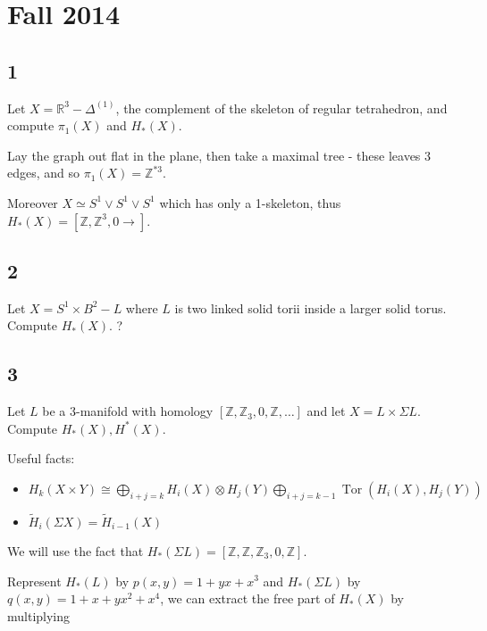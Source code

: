 \hypertarget{fall-2014}{%
\section{Fall 2014}\label{fall-2014}}

\hypertarget{section}{%
\subsection{1}\label{section}}

Let \(X = {\mathbb{R}}^3 - \Delta^{(1)}\), the complement of the
skeleton of regular tetrahedron, and compute \(\pi_1(X)\) and
\(H_*(X)\).

Lay the graph out flat in the plane, then take a maximal tree - these
leaves 3 edges, and so \(\pi_1(X) = {\mathbb{Z}}^{\ast 3}\).

Moreover \(X \simeq S^1\vee S^1 \vee S^1\) which has only a 1-skeleton,
thus \(H_*(X) = [{\mathbb{Z}}, {\mathbb{Z}}^3, 0\rightarrow]\).

\hypertarget{section-1}{%
\subsection{2}\label{section-1}}

Let \(X = S^1 \times B^2 - L\) where \(L\) is two linked solid torii
inside a larger solid torus. Compute \(H_*(X)\). ?

\hypertarget{section-2}{%
\subsection{3}\label{section-2}}

Let \(L\) be a 3-manifold with homology
\([{\mathbb{Z}}, {\mathbb{Z}}_3, 0, {\mathbb{Z}}, \ldots]\) and let
\(X = L \times\Sigma L\). Compute \(H_*(X), H^*(X)\).

Useful facts:

\begin{itemize}
\tightlist
\item
  \(H_{k}(X\times Y) \cong \bigoplus _{{i+j=k}}H_{i}(X)\otimes H_{j}(Y) \bigoplus_{i+j=k-1}\operatorname{Tor}(H_i(X), H_j(Y))\)
\item
  \(\tilde H_i(\Sigma X) = \tilde H_{i-1}(X)\)
\end{itemize}

We will use the fact that
\(H_*(\Sigma L) = [{\mathbb{Z}}, {\mathbb{Z}}, {\mathbb{Z}}_3, 0, {\mathbb{Z}}]\).

Represent \(H_*(L)\) by \(p(x, y) = 1 + yx + x^3\) and \(H_*(\Sigma L)\)
by \(q(x,y) = 1 + x + yx^2 + x^4\), we can extract the free part of
\(H_*(X)\) by multiplying

